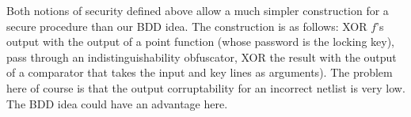 \documentclass[conference,compsoc]{IEEEtran}
\newtheorem{proposition}[theorem]{Proposition}
\begin{document}
Both notions of security defined above allow a much simpler construction for a secure procedure than our BDD idea. The construction is as follows: XOR $f$'s output with the output of a point function (whose password is the locking key), pass through an indistinguishability obfuscator, XOR the result with the output of a comparator that takes the input and key lines as arguments). The problem here of course is that the output corruptability for an incorrect netlist is very low. The BDD idea could have an advantage here.








\end{document}
